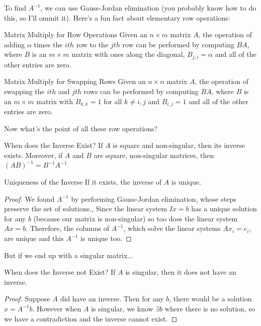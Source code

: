 \documentclass[11pt]{article}
\begin{document}
To find $A^{-1}$, we can use Gauss-Jordan elimination (you probably know how to do this, so I'll
ommit it). Here's a fun fact about elementary row operations:

\begin{definitionbox}{Matrix Multiply for Row Operations}
    Given an $n \times m$ matrix $A$, the operation of adding $\alpha$ times the $ith$ row to the
    $jth$ row can be performed by computing $BA$, where $B$ is an $m \times m$ matrix with ones
    along the diagonal, $B_{j,i}=\alpha$ and all of the other entries are zero.
\end{definitionbox}

\begin{definitionbox}{Matrix Multiply for Swapping Rows}
    Given an $n \times n$ matrix $A$, the operation of swapping the $ith$ and $jth$ rows can be
    performed by computing $BA$, where $B$ is an $m \times m$ matrix with $B_{k,k}=1$ for all
    $k \neq i,j$ and $B_{i,j}=1$ and all of the other entries are zero.
\end{definitionbox}

Now what's the point of all these row operations?

\begin{theorembox}{When does the Inverse Exist?}
    If $A$ is square and non-singular, then its inverse exists. Moreover, if $A$ and $B$ are square,
    non-singular matrices, then $(AB)^{-1}=B^{-1}A^{-1}$
\end{theorembox}

\begin{theorembox}{Uniqueness of the Inverse}
    If it exists, the inverse of $A$ is unique.
\end{theorembox}
\begin{proof}
    We found $A^{-1}$ by performing Gauss-Jordan elimination, whose steps preserve the set of
    solutions., Since the linear system $Ix=b$ has a unique solution for any $b$ (because our matrix
    is non-singular) so too does the linear system $Ax=b$. Therefore, the columns of $A^{-1}$, which
    solve the linear systems $Ax_i=e_i$, are unique and this $A^{-1}$ is unique too.
\end{proof}

But if we end up with a singular matrix...

\begin{theorembox}{When does the Inverse not Exist?}
    If $A$ is singular, then it does not have an inverse.
\end{theorembox}
\begin{proof}
    Suppose $A$ did have an inverse. Then for any $b$, there would be a solution $x=A^{-1}b$. However
    when $A$ is singular, we know $\exists b$ where there is no solution, so we have a contradiction
    and the inverse cannot exist.
\end{proof}
\end{document}
